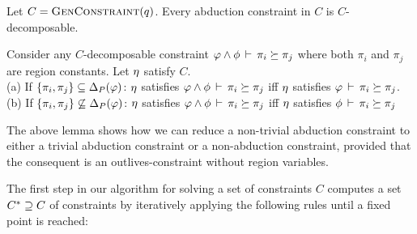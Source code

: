 \begin{lemma}
  \label{lemma:gc-is-decomposable}
  Let $C = \textsc{GenConstraint}(q)$. Every abduction constraint in $C$ is $C$-decomposable.
\end{lemma}


\begin{lemma}
  \label{lemma:decomposition}
Consider any $C$-decomposable constraint $\varphi \wedge \phi\,\vdash\,\pi_i \succeq \pi_j$
where both $\pi_i$ and $\pi_j$ are region constants.
Let $\eta$ satisfy $C$.\\
(a) If $\{ \pi_i, \pi_j \} \subseteq {\Delta_P}(\varphi)$:
$\eta$ satisfies $\varphi \wedge \phi\,\vdash\,\pi_i \succeq \pi_j$
iff
$\eta$ satisfies $\varphi\,\vdash\,\pi_i \succeq \pi_j$.\\
(b) If $\{ \pi_i, \pi_j \} \not \subseteq {\Delta_P}(\varphi)$:
$\eta$ satisfies $\varphi \wedge \phi\,\vdash\,\pi_i \succeq \pi_j$
iff
$\eta$ satisfies $\phi\,\vdash\,\pi_i \succeq \pi_j$
\end{lemma}

The above lemma shows how we can reduce a non-trivial abduction constraint to
either a trivial abduction constraint or a non-abduction constraint,
provided that the consequent is an outlives-constraint without region variables.

The first step in our algorithm for solving a set of constraints $C$
computes a set ${C}^* \supseteq C$ of constraints by iteratively applying
the following rules until a fixed point is reached:

